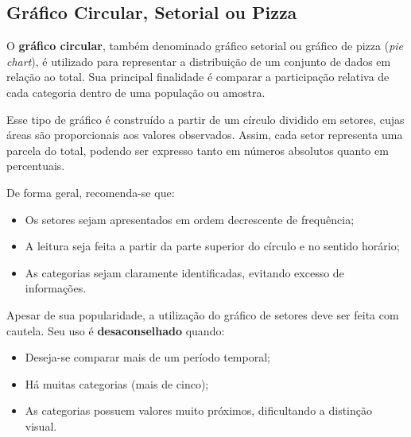 

\subsection{Gráfico Circular, Setorial ou Pizza}

O \textbf{gráfico circular}, também denominado gráfico setorial ou gráfico de
pizza (\textit{pie chart}), é utilizado para representar a distribuição de
um conjunto de dados em relação ao total. Sua principal finalidade é comparar
a participação relativa de cada categoria dentro de uma população ou amostra. \vskip0.3cm

Esse tipo de gráfico é construído a partir de um círculo dividido em setores,
cujas áreas são proporcionais aos valores observados. Assim, cada setor
representa uma parcela do total, podendo ser expresso tanto em números
absolutos quanto em percentuais. \vskip0.3cm

De forma geral, recomenda-se que:

\begin{itemize}
    \item Os setores sejam apresentados em ordem decrescente de frequência;
    \item A leitura seja feita a partir da parte superior do círculo e no sentido horário;
    \item As categorias sejam claramente identificadas, evitando excesso de informações.
\end{itemize}

Apesar de sua popularidade, a utilização do gráfico de setores deve ser feita
com cautela. Seu uso é \textbf{desaconselhado} quando:

\begin{itemize}
    \item Deseja-se comparar mais de um período temporal;
    \item Há muitas categorias (mais de cinco);
    \item As categorias possuem valores muito próximos, dificultando a distinção visual.
\end{itemize}

